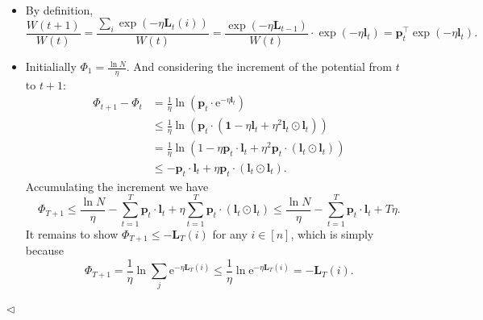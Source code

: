 ﻿\documentclass[11pt]{article}
\newenvironment{answer}[1][Answer]{\begin{trivlist}
\item[\hskip \labelsep {\bfseries #1.}\hskip \labelsep]}{\hfill$\lhd$\end{trivlist}}
\begin{document}
\begin{answer} ~
\begin{itemize}
    \item[(1)] By definition,
    $$
        \frac{W(t+1)}{W(t)} = \frac{\sum_i\exp(-\eta\bm{L}_t(i))}{W(t)}
        = \frac{\exp(-\eta\bm{L}_{t-1})}{W(t)}\cdot \exp(-\eta\bm{l}_t)
        = \bm{p}_t^\intercal\exp(-\eta\bm{l}_t).
    $$

    \item[(2)] Initialially $\Phi_1=\frac{\ln N}{\eta}$. And considering the increment of the potential from $t$ to $t+1$:
    $$
        \begin{aligned}
            \Phi_{t+1}-\Phi_t
            &= \frac{1}{\eta}\ln\left(\bm{p}_t\cdot \mathrm{e}^{-\eta\bm{l}_t}\right)\\
            &\le \frac{1}{\eta}\ln\left(\bm{p}_t\cdot(\bm{1}-\eta\bm{l}_t+\eta^2\bm{l}_t\odot\bm{l}_t)\right)\\
            &= \frac{1}{\eta}\ln\left(1-\eta\bm{p}_t\cdot \bm{l}_t+\eta^2\bm{p}_t\cdot(\bm{l}_t\odot\bm{l}_t)\right)\\
            &\le -\bm{p}_t\cdot\bm{l}_t+\eta\bm{p}_t\cdot(\bm{l}_t\odot\bm{l}_t).
        \end{aligned}
    $$
    Accumulating the increment we have
    $$
        \Phi_{T+1}\le \frac{\ln N}{\eta}-\sum_{t=1}^T\bm{p}_t\cdot \bm{l}_t+\eta\sum_{t=1}^T\bm{p}_t\cdot(\bm{l}_t\odot\bm{l}_t)\le \frac{\ln N}{\eta}-\sum_{t=1}^T\bm{p}_t\cdot \bm{l}_t+T\eta.
    $$
    It remains to show $\Phi_{T+1}\le-\bm{L}_T(i)$ for any $i\in[n]$, which is simply because
    $$
        \Phi_{T+1}=\frac{1}{\eta}\ln\sum_j\mathrm{e}^{-\eta\bm{L}_T(i)}\le\frac{1}{\eta}\ln\mathrm{e}^{-\eta\bm{L}_T(i)}=-\bm{L}_T(i).
    $$
\end{itemize}
\end{answer}
\end{document}
